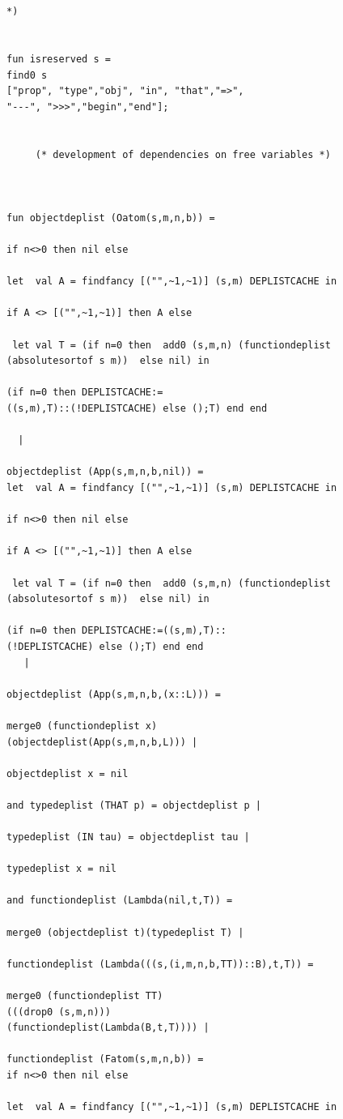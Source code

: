 \documentclass[12pt]{article}
\begin{document}
\begin{verbatim}


*)


fun isreserved s = 
find0 s 
["prop", "type","obj", "in", "that","=>",
"---", ">>>","begin","end"];		


     (* development of dependencies on free variables *)



fun objectdeplist (Oatom(s,m,n,b)) =

if n<>0 then nil else 

let  val A = findfancy [("",~1,~1)] (s,m) DEPLISTCACHE in

if A <> [("",~1,~1)] then A else

 let val T = (if n=0 then  add0 (s,m,n) (functiondeplist 
(absolutesortof s m))  else nil) in

(if n=0 then DEPLISTCACHE:=
((s,m),T)::(!DEPLISTCACHE) else ();T) end end

  |

objectdeplist (App(s,m,n,b,nil)) =
let  val A = findfancy [("",~1,~1)] (s,m) DEPLISTCACHE in

if n<>0 then nil else

if A <> [("",~1,~1)] then A else

 let val T = (if n=0 then  add0 (s,m,n) (functiondeplist 
(absolutesortof s m))  else nil) in

(if n=0 then DEPLISTCACHE:=((s,m),T)::
(!DEPLISTCACHE) else ();T) end end
   |

objectdeplist (App(s,m,n,b,(x::L))) =

merge0 (functiondeplist x)
(objectdeplist(App(s,m,n,b,L))) |

objectdeplist x = nil 

and typedeplist (THAT p) = objectdeplist p |

typedeplist (IN tau) = objectdeplist tau |

typedeplist x = nil

and functiondeplist (Lambda(nil,t,T)) =

merge0 (objectdeplist t)(typedeplist T) |

functiondeplist (Lambda(((s,(i,m,n,b,TT))::B),t,T)) =

merge0 (functiondeplist TT)
(((drop0 (s,m,n)))
(functiondeplist(Lambda(B,t,T)))) |

functiondeplist (Fatom(s,m,n,b)) = 
if n<>0 then nil else

let  val A = findfancy [("",~1,~1)] (s,m) DEPLISTCACHE in


\end{verbatim}
\end{document}
